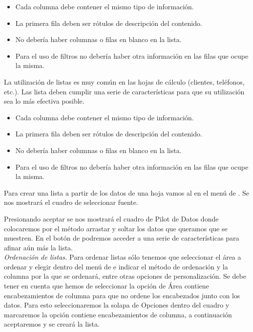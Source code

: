 \begin{itemize}
\item Cada columna debe contener el mismo tipo de información.
\item La primera fila deben ser rótulos de descripción del contenido.
\item No debería haber columnas o filas en blanco en la lista.
\item Para el uso de filtros no debería haber otra información en las filas que
ocupe la misma.
\end{itemize}


La utilización de listas es muy común en las hojas de cálculo (clientes,
teléfonos, etc.). Las lista deben cumplir una serie de características para
que su utilización sea lo más efectiva posible.

\begin{itemize}
\item Cada columna debe contener el mismo tipo de información.
\item La primera fila deben ser rótulos de descripción del contenido.
\item No debería haber columnas o filas en blanco en la lista.
\item Para el uso de filtros no debería haber otra información en las filas
que ocupe la misma.
\end{itemize}

Para crear una lista a partir de los datos de una hoja vamos al
 en el menú de .  Se nos mostrará el
cuadro de seleccionar fuente.


Presionando aceptar se nos mostrará  el cuadro de Pilot de Datos
donde colocaremos por el método arrastar y soltar los datos que  queramos que
se muestren. En el botón de  podremos acceder a una serie de
características  para afinar aún más la lista.\\

\emph{Ordenación de listas.}
Para ordenar listas sólo tenemos que seleccionar el área a ordenar y elegir
 dentro del menú  de  e indicar el método de
ordenación y la columna por la que se ordenará, entre otras opciones  de
personalización. Se debe tener en cuenta que hemos de seleccionar la opción de
Área contiene  encabezamientos de columna para que no ordene los encabezados
junto con los datos. Para esto  seleccionaremos la solapa de Opciones dentro
del cuadro  y marcaremos la opción  contiene 
encabezamientos de columna, a continuación aceptaremos y se creará la lista.   

